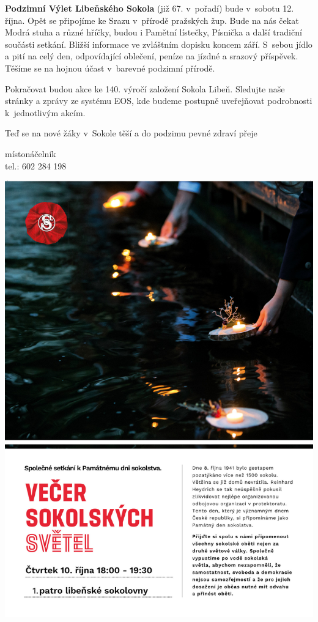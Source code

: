 \documentclass[11pt]{article}
\begin{document}
\textbf{Podzimní Výlet Libeňského Sokola} (již 67. v~pořadí) bude v~sobotu 12. října. Opět se připojíme ke Srazu v~přírodě pražských žup. Bude na nás čekat Modrá stuha a různé hříčky, budou i Pamětní lístečky, Písnička a další tradiční součásti setkání. Bližší informace ve zvláštním dopisku koncem září. S~sebou jídlo a pití na celý den, odpovídající oblečení, peníze na jízdné a srazový příspěvek. Těšíme se na hojnou účast v~barevné podzimní přírodě.

Pokračovat budou akce ke 140. výročí založení Sokola Libeň. Sledujte naše stránky a zprávy ze systému EOS, kde budeme postupně uveřejňovat podrobnosti k~jednotlivým akcím. 

Teď se na nové žáky v~Sokole těší a do podzimu pevné zdraví přeje

\signature{Jiří Novák (Jirkan)}{místonáčelník\\tel.: 602 284 198}


\clearpage

\pagestyle{blank}
\begin{center}
  \noindent\includegraphics[width=\linewidth]{pamatny-den-sokolstva.jpg}
\end{center}
\restoregeometry
\end{document}
